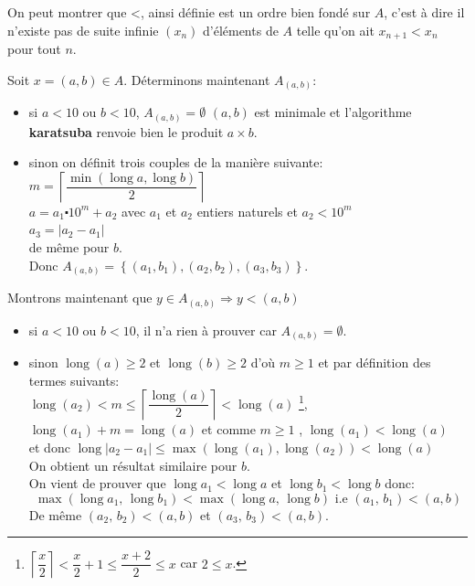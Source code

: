 \documentclass[11pt,french]{article}
\theoremstyle{plain}
\DeclareMathOperator{\lgd}{long}
\newcommand{\cd}{\centerdot}
\begin{document}
 On peut montrer que <, ainsi définie est un ordre bien fondé sur $A$, c'est à dire  il n'existe pas de suite infinie $(x_n)$ d'éléments de $A$ telle qu'on ait $x_{n+1} < x_n$ pour tout $n$.
 
 Soit $x=(a,b)\in A$. Déterminons maintenant $A_(a,b)$:
 \begin{itemize}
    \item si $a<10$ ou $b<10$, $A_{(a,b)} = \emptyset$ $(a,b)$ est minimale et l'algorithme \textbf{karatsuba} renvoie bien le produit $a\times b$.
    \item sinon on définit trois couples de la manière suivante:\\
    $ m = \left\lceil \dfrac{\min\left(\lgd a , \lgd b \right)}{2}\right\rceil$ \\
    $a=a_1\cd10^m+a_2$ avec $a_1$ et $a_2$ entiers naturels et $a_2 < 10^m$ \\
    $a_3=\left| a_2-a_1\right| $ \\
    de même pour $b$.\\
    Donc $A_{(a,b)} = \left\lbrace (a_1,b_1),(a_2,b_2),(a_3,b_3) \right\rbrace $.\\
\end{itemize}

Montrons maintenant que $ y \in A_{(a,b)} \Rightarrow y < (a,b)$
 \begin{itemize}
            \item si $a< 10  \text{ ou } b< 10$, il n'a rien à prouver car  $A_{(a,b)} = \emptyset$.
            \item  sinon $\lgd\left( a\right) \geqslant 2 $ et $\lgd\left( b\right)  \geqslant 2$ d'où $m\geqslant 1$ et par définition des termes suivants:\\
             $\lgd\left( a_2\right) < m \leqslant \left\lceil \dfrac{\lgd\left( a \right)}{2} \right\rceil  <  \lgd\left( a \right)$ \footnote{\label{dem1}$\left\lceil \dfrac{x}{2}\right\rceil<\dfrac{x}{2}+1\leqslant \dfrac{x+2}{2}\leqslant x$ car $2\leqslant x$.},\\
             $\lgd\left( a_1 \right)  + m =\lgd\left( a \right) $ et comme $m \geqslant 1$ ,  $\lgd\left( a_1\right) <   \lgd\left( a\right)$\\
             et donc $\lgd \left| a_2-a_1\right|  \leqslant \max \left( \lgd\left( a_1\right), \lgd\left(   a_2\right)  \right) <  \lgd\left( a\right)$\\
             On obtient un résultat similaire pour $b$. \\On vient de prouver que 
             $\lgd a_1 < \lgd a $ et $\lgd b_1 < \lgd b $ donc: \[\max\left(\lgd a_1,\, \lgd b_1 \right) < \max (\lgd a,\,\lgd  b) \text{ i.e } \left( a_1,\, b_1 \right) <(a,b) \] 
             De même  $(a_2,\, b_2)<(a,b)$ et $(a_3, \, b_3)<(a,b)$.
\end{itemize}
\end{document}
